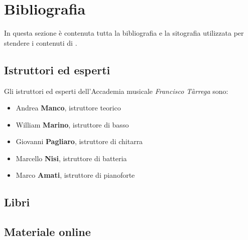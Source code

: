\section{Bibliografia}
In questa sezione è contenuta tutta la bibliografia e la sitografia utilizzata
per stendere i contenuti di \ProjectTitle{}.
\subsection{Istruttori ed esperti}
Gli istruttori ed esperti dell'Accademia musicale \emph{Francisco Tàrrega} sono:
\begin{itemize}
	\item Andrea \textbf{Manco}, istruttore teorico
	\item William \textbf{Marino}, istruttore di basso
	\item Giovanni \textbf{Pagliaro}, istruttore di chitarra
	\item Marcello \textbf{Nisi}, istruttore di batteria
	\item Marco \textbf{Amati}, istruttore di pianoforte
\end{itemize}
\nocite{*}
\subsection{Libri}
\printbibliography[heading=none,type=book]
\subsection{Materiale online}
\printbibliography[heading=none,type=online]